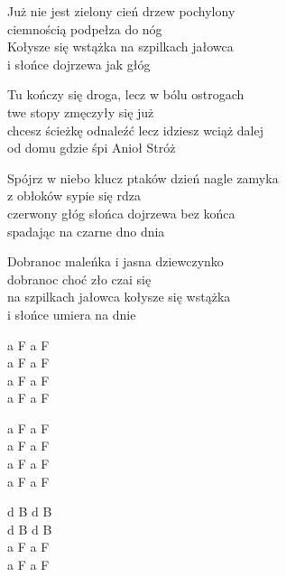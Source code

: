 \begin{text}
    Już nie jest zielony cień drzew pochylony\\
    ciemnością podpełza do nóg\\
    Kołysze się wstążka na szpilkach jałowca\\
    i słońce dojrzewa jak głóg

    Tu kończy się droga, lecz w bólu ostrogach\\
    twe stopy zmęczyły się już\\
    chcesz ścieżkę odnaleźć lecz idziesz wciąż dalej\\
    od domu gdzie śpi Anioł Stróż

    Spójrz w niebo klucz ptaków dzień nagle zamyka\\
    z obłoków sypie się rdza\\
    czerwony głóg słońca dojrzewa bez końca\\
    spadając na czarne dno dnia

    Dobranoc maleńka i jasna dziewczynko\\
    dobranoc choć zło czai się\\
    na szpilkach jałowca kołysze się wstążka\\
    i słońce umiera na dnie
\end{text}
\begin{chord}
    a F a F\\
    a F a F\\
    a F a F\\
    a F a F

    a F a F\\
    a F a F\\
    a F a F\\
    a F a F

    d B d B\\
    d B d B\\
    a F a F\\
    a F a F
\end{chord}